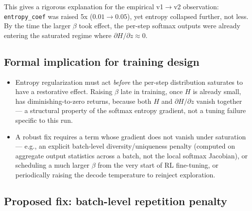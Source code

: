 \documentclass[11pt]{article}
\newcommand{\code}[1]{\texttt{#1}}
\begin{document}
This gives a rigorous explanation for the empirical v1$\to$v2 observation: \code{entropy\_coef} was raised 5x ($0.01\to0.05$), yet entropy collapsed further, not less. By the time the larger $\beta$ took effect, the per-step softmax outputs were already entering the saturated regime where $\partial H/\partial z \approx 0$.

\subsection{Formal implication for training design}
\label{sec:8.5}

\begin{itemize}
  \item Entropy regularization must act \emph{before} the per-step distribution saturates to have a restorative effect. Raising $\beta$ late in training, once $H$ is already small, has diminishing-to-zero returns, because both $H$ and $\partial H/\partial z$ vanish together --- a structural property of the softmax entropy gradient, not a tuning failure specific to this run.
  \item A robust fix requires a term whose gradient does not vanish under saturation --- e.g., an explicit batch-level diversity/uniqueness penalty (computed on aggregate output statistics across a batch, not the local softmax Jacobian), or scheduling a much larger $\beta$ from the very start of RL fine-tuning, or periodically raising the decode temperature to reinject exploration.
\end{itemize}

\subsection{Proposed fix: batch-level repetition penalty}
\label{sec:penalty}
\end{document}

